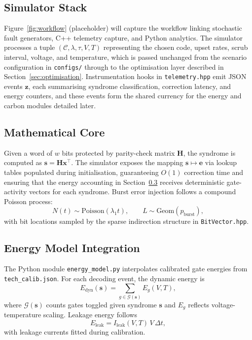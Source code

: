 \documentclass[conference]{IEEEtran}
\begin{document}
\subsection{Simulator Stack}
Figure~\ref{fig:workflow} (placeholder) will capture the workflow linking stochastic fault generators, C++ telemetry capture, and Python analytics.
The simulator processes a tuple $(\mathcal{C}, \lambda, \tau, V, T)$ representing the chosen code, upset rates, scrub interval, voltage, and temperature, which is passed unchanged from the scenario configuration in \texttt{configs/} through to the optimisation layer described in Section~\ref{sec:optimisation}.
Instrumentation hooks in \texttt{telemetry.hpp} emit JSON events $\mathbf{z}$, each summarising syndrome classification, correction latency, and energy counters, and these events form the shared currency for the energy and carbon modules detailed later.

\subsection{Mathematical Core}
\label{sec:mathcore}
Given a word of $w$ bits protected by parity-check matrix $\mathbf{H}$, the syndrome is computed as $\mathbf{s}=\mathbf{H}\mathbf{x}^{\top}$.
The simulator exposes the mapping $\mathbf{s}\mapsto \mathbf{e}$ via lookup tables populated during initialisation, guaranteeing $O(1)$ correction time and ensuring that the energy accounting in Section~\ref{sec:energy} receives deterministic gate-activity vectors for each syndrome.
Burst error injection follows a compound Poisson process:
\begin{equation}
N(t) \sim \text{Poisson}(\lambda_{1} t),\qquad L \sim \text{Geom}(p_{\text{burst}}),
\end{equation}
with bit locations sampled by the sparse indirection structure in \texttt{BitVector.hpp}.

\subsection{Energy Model Integration}
\label{sec:energy}
The Python module \texttt{energy\_model.py} interpolates calibrated gate energies from \texttt{tech\_calib.json}.
For each decoding event, the dynamic energy is
\begin{equation}
E_{\text{dyn}}(\mathbf{s}) = \sum_{g \in \mathcal{G}(\mathbf{s})} E_{g}(V, T),
\end{equation}
where $\mathcal{G}(\mathbf{s})$ counts gates toggled given syndrome $\mathbf{s}$ and $E_{g}$ reflects voltage-temperature scaling.
Leakage energy follows
\begin{equation}
E_{\text{leak}} = I_{\text{leak}}(V,T)\,V\,\Delta t,
\end{equation}
with leakage currents fitted during calibration.
\end{document}
